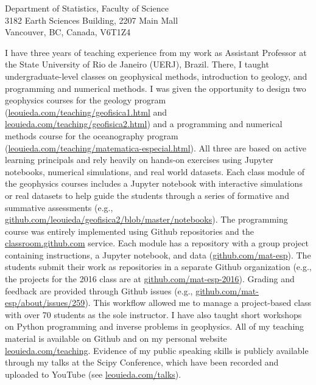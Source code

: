 \documentclass[11pt]{letter}
\begin{document}
\begin{letter}{
    Department of Statistics, Faculty of Science
    \\
    3182 Earth Sciences Building, 2207 Main Mall
    \\
    Vancouver, BC, Canada, V6T1Z4
}

I have three years of teaching experience from my work as Assistant Professor
at the State University of Rio de Janeiro (UERJ), Brazil.
There, I taught undergraduate-level classes on geophysical methods,
introduction to geology, and programming and numerical methods.
I was given the opportunity to design two geophysics courses for the geology
program
(\href{http://www.leouieda.com/teaching/geofisica1.html}{leouieda.com/teaching/geofisica1.html}
and
\href{http://www.leouieda.com/teaching/geofisica2.html}{leouieda.com/teaching/geofisica2.html})
and a programming and numerical methods course for the oceanography
program
(\href{http://www.leouieda.com/teaching/matematica-especial.html}{leouieda.com/teaching/matematica-especial.html}).
All three are based on active learning principals and rely heavily on hands-on
exercises using Jupyter notebooks, numerical simulations, and real world
datasets.
Each class module of the geophysics courses includes a Jupyter notebook with
interactive simulations or real datasets to help guide the students through a
series of formative and summative assessments
(e.g.,
\href{https://github.com/leouieda/geofisica2/blob/master/notebooks/}{github.com/leouieda/geofisica2/blob/master/notebooks}).
The programming course was entirely implemented using Github repositories and
the \href{https://classroom.github.com/}{classroom.github.com} service.
Each module has a repository with a group project containing instructions, a
Jupyter notebook, and data
(\href{https://github.com/mat-esp}{github.com/mat-esp}).
The students submit their work as repositories in a separate Github
organization
(e.g., the projects for the
2016 class are at
\href{https://github.com/mat-esp-2016}{github.com/mat-esp-2016}).
Grading and feedback are provided through Github issues (e.g.,
\href{https://github.com/mat-esp/about/issues/259}{github.com/mat-esp/about/issues/259}).
This workflow allowed me to manage a project-based class with over 70 students
as the sole instructor.
I have also taught short workshops on Python programming and inverse problems
in geophysics.
All of my teaching material is available on Github and on my personal website
\href{http://www.leouieda.com/teaching/}{leouieda.com/teaching}.
Evidence of my public speaking skills is publicly available through my talks at
the Scipy Conference, which have been recorded and uploaded to YouTube (see
\href{http://www.leouieda.com/talks/}{leouieda.com/talks}).




\end{letter}
\end{document}
